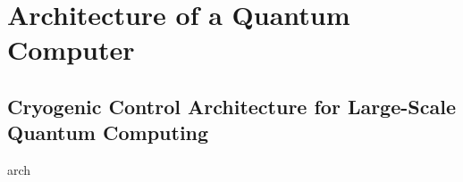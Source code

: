 \chapter{Architecture of a Quantum Computer}

\clearpage
\section{Cryogenic Control Architecture for Large-Scale Quantum Computing}
{arch}